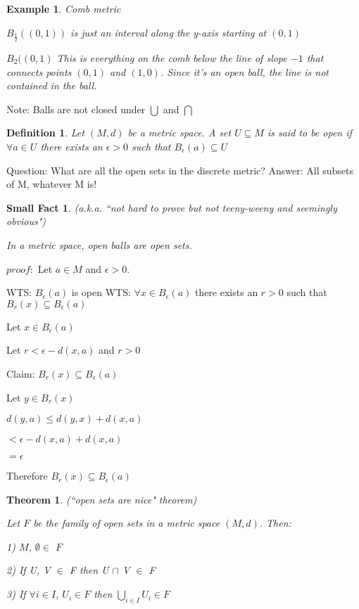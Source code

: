 \documentclass{article}
\newtheorem{Thm}{Theorem}
\newtheorem{Ex}{Example}
\newtheorem{Def}{Definition}
\newtheorem{smallf}{Small Fact}
\begin{document}
\begin{Ex}

Comb metric

$B_{\frac{1}{2}} ((0,1))$ is just an interval along the y-axis starting at $(0,1)$

$B_2 ((0,1)$ This is everything on the comb below the line of slope $-1$ that connects points $(0,1)$ and $(1,0)$. Since it's an open ball, the line is not contained in
the ball.

\end{Ex}

Note: Balls are not closed under $\bigcup$ and $\bigcap$

\begin{Def}

Let $(M,d)$ be a metric space. A set $U \subseteq M$ is said to be open if $\forall a\in U$ there exists an $\epsilon >0$ such that $B_\epsilon (a) \subseteq U$

\end{Def}


Question: What are all the open sets in the discrete metric?
Answer: All subsets of M, whatever M is!

\begin{smallf} (a.k.a. ``not hard to prove but not teeny-weeny and seemingly obvious")

In a metric space, open balls are open sets.

\end{smallf}

$proof:$
Let $a \in M$ and $\epsilon >0$.

WTS: $B_\epsilon (a)$ is open
WTS: $\forall x \in B_\epsilon (a)$ there exists an $r>0$ such that $B_r (x) \subseteq B_\epsilon (a)$

Let $x \in B_\epsilon (a)$

Let $r < \epsilon - d(x,a)$ and $r > 0$

Claim: $B_r (x) \subseteq B_\epsilon (a)$

Let $y \in B_r (x)$

$d(y,a)\leq d(y,x) + d(x,a)$

$< \epsilon - d(x,a) + d(x,a)$

$= \epsilon$

Therefore $B_r (x) \subseteq B_\epsilon (a)$



\begin{Thm} (``open sets are nice" theorem)

Let $F$ be the family of open sets in a metric space $(M,d)$. Then:

1) $M$, $\emptyset \in$ $F$

2) If U, V $\in$ F then U $\cap$ V $\in$ F

3) If $\forall i \in I$, $U_i \in F$ then $\bigcup_{i \in I} U_i \in F$


\end{Thm}
\end{document}
